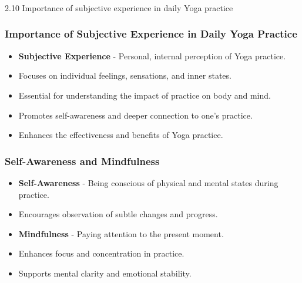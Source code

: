 \begin{frame}[fragile]\frametitle{}
\begin{center}
{\Large 2.10  Importance of subjective experience in daily Yoga practice}
\end{center}
\end{frame}

\begin{frame}[fragile]\frametitle{Importance of Subjective Experience in Daily Yoga Practice}

      \begin{itemize}
		\item \textbf{Subjective Experience} - Personal, internal perception of Yoga practice.
		\item Focuses on individual feelings, sensations, and inner states.
		\item Essential for understanding the impact of practice on body and mind.
		\item Promotes self-awareness and deeper connection to one’s practice.
		\item Enhances the effectiveness and benefits of Yoga practice.
	  \end{itemize}

\end{frame}

\begin{frame}[fragile]\frametitle{Self-Awareness and Mindfulness}

      \begin{itemize}
		\item \textbf{Self-Awareness} - Being conscious of physical and mental states during practice.
		\item Encourages observation of subtle changes and progress.
		\item \textbf{Mindfulness} - Paying attention to the present moment.
		\item Enhances focus and concentration in practice.
		\item Supports mental clarity and emotional stability.
	  \end{itemize}

\end{frame}

